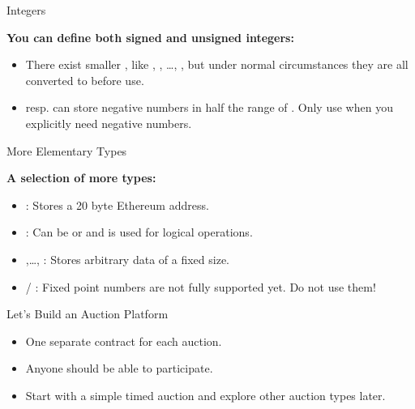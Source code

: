 \documentclass[handout]{beamer}
\begin{document}
\begin{frame}{Integers}

\textbf{You can define both signed and unsigned integers:}
\begin{itemize}
 \item<1->{There exist smaller , like , , \dots , , but under normal circumstances they are all converted to before use.}
 
\item<2->{resp. can store negative numbers in half the range of . Only use when you explicitly need negative numbers. }
\end{itemize}

\end{frame}

\begin{frame}{More Elementary Types}

\textbf{A selection of more types:}
\begin{itemize}
	\item<1-> : Stores a 20 byte Ethereum address.
	\item<2-> : Can be or and is used for logical operations.
	\item<3-> ,\dots, : Stores arbitrary data of a fixed size.
	\item<4->  / : Fixed point numbers are not fully supported yet. Do not use them!
\end{itemize}

\vspace{1em}

	
\end{frame}

\begin{frame}{Let's Build an Auction Platform}

	\begin{itemize}
		\item<1->{One separate contract for each auction.}
		\item<1->{Anyone should be able to participate.}
		\item<1->{Start with a simple timed auction and explore other auction types later.}
	\end{itemize}
	
	
\end{frame}
\end{document}
